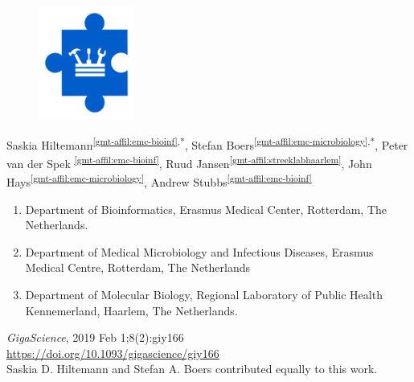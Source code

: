 \cleartorightpage
\setcounter{NAT@ctr}{-1}
\chapter*{}\label{chapter:gmt}

\begin{figure}[t!]
\centering
\includegraphics[height=10em]{frontmatter/images/chapter-header-tools.png}
\end{figure}
\vspace{-4cm}

Saskia Hiltemann\textsuperscript{\ref{gmt-affil:emc-bioinf},*},
Stefan Boers\textsuperscript{\ref{gmt-affil:emc-microbiology},*},
Peter van der Spek \textsuperscript{\ref{gmt-affil:emc-bioinf}},
Ruud Jansen\textsuperscript{\ref{gmt-affil:streeklabhaarlem}},
John Hays\textsuperscript{\ref{gmt-affil:emc-microbiology}},
Andrew Stubbs\textsuperscript{\ref{gmt-affil:emc-bioinf}}

\small
\begin{enumerate}
\itemsep-0.5em
\item Department of Bioinformatics, Erasmus Medical Center, Rotterdam, The Netherlands.\label{gmt-affil:emc-bioinf}
\item Department of Medical Microbiology and Infectious Diseases, Erasmus Medical Centre, Rotterdam, The Netherlands\label{gmt-affil:emc-microbiology}
\item Department of Molecular Biology, Regional Laboratory of Public Health Kennemerland, Haarlem, The Netherlands.\label{gmt-affil:streeklabhaarlem}
\end{enumerate}

{\color{chaptergrey}{Published in:}} \emph{GigaScience}, 2019 Feb 1;8(2):giy166 \\
{\color{chaptergrey}{DOI:}} \url{https://doi.org/10.1093/gigascience/giy166} \\
{\color{chaptergrey}{*:}} Saskia D. Hiltemann and Stefan A. Boers contributed equally to this work.


